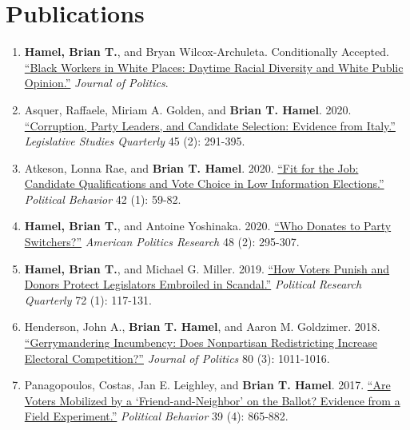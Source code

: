 \documentclass[12pt]{article}
\begin{document}
\section*{Publications}

\begin{enumerate}[topsep = 0pt, itemsep = 1ex, partopsep  = 1ex, parsep = 1ex]

	\item[] \textbf{Hamel, Brian T.}, and Bryan Wilcox-Archuleta. Conditionally Accepted. \href{https://www.brianhamel.me/files/context.pdf}{``Black Workers in White Places: Daytime Racial Diversity and White Public Opinion.''} \textit{Journal of Politics}.

	\item[] Asquer, Raffaele, Miriam A. Golden, and \textbf{Brian T. Hamel}. 2020. \href{https://www.brianhamel.me/files/italy.pdf}{``Corruption, Party Leaders, and Candidate Selection: Evidence from Italy.''} \textit{Legislative Studies Quarterly} 45 (2): 291-395.
	
	\item[] Atkeson, Lonna Rae, and \textbf{Brian T. Hamel}. 2020. \href{https://www.brianhamel.me/files/teachers.pdf}{``Fit for the Job: Candidate Qualifications and Vote Choice in Low Information Elections.''} \textit{Political Behavior} 42 (1): 59-82.
	
	\item[] \textbf{Hamel, Brian T.}, and Antoine Yoshinaka. 2020. \href{https://www.brianhamel.me/files/switchers.pdf}{``Who Donates to Party Switchers?''} \textit{American Politics Research} 48 (2): 295-307.

	\item[] \textbf{Hamel, Brian T.}, and Michael G. Miller. 2019. \href{https://www.brianhamel.me/files/scandal.pdf}{``How Voters Punish and Donors Protect Legislators Embroiled in Scandal.''} \textit{Political Research Quarterly} 72 (1): 117-131.

	\item[] Henderson, John A., \textbf{Brian T. Hamel}, and Aaron M. Goldzimer. 2018. \href{https://www.brianhamel.me/files/gerrymandering.pdf}{``Gerrymandering Incumbency: Does Nonpartisan Redistricting Increase Electoral Competition?''} \textit{Journal of Politics} 80 (3): 1011-1016.

	\item[] Panagopoulos, Costas, Jan E. Leighley, and \textbf{Brian T. Hamel}. 2017. \href{https://www.brianhamel.me/files/friends.pdf}{``Are Voters Mobilized by a `Friend-and-Neighbor' on the Ballot? Evidence from a Field Experiment.''} \textit{Political Behavior} 39 (4): 865-882.

\end{enumerate}
\end{document}
